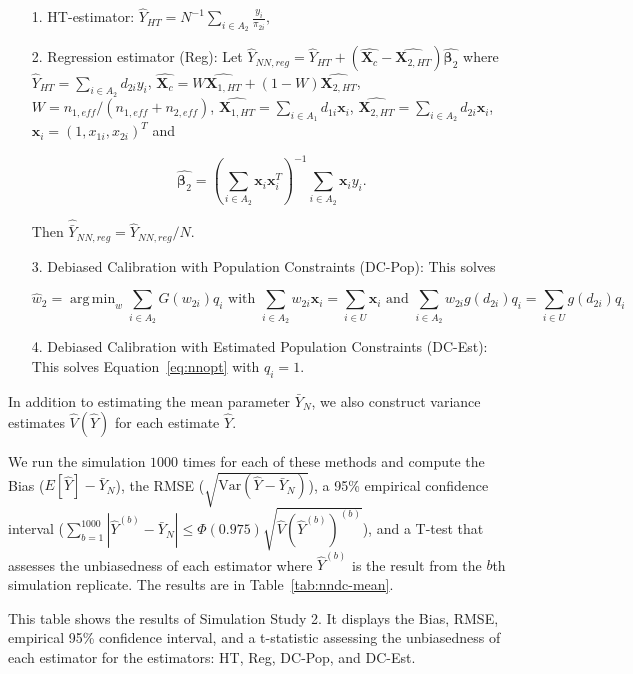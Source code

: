 \documentclass[12pt]{article}
\DeclareMathOperator*{\argmin}{arg\,min}
\newcommand{\Var}{{\text{Var}}}
\renewcommand{\bf}[1]{\mathbf{#1}}
\begin{document}
\begin{itemize}
  \item[1.] HT-estimator: $\hat Y_{HT} = N^{-1} \sum_{i \in A_2}
    \frac{y_i}{\pi_{2i}},$
  \item[2.] Regression estimator (Reg): Let $\hat Y_{NN, reg} = \hat Y_{HT} + (
    \hat{\bf X_c} - \hat{\bf X_{2, HT}}) \hat{\bm \beta_2}$ where $\hat Y_{HT} =
    \sum_{i \in A_2} d_{2i} y_i$, $\hat{\bf X_c} = W \hat{\bf X_{1, HT}} + (1 -
    W)\hat{\bf X_{2, HT}}$, $W = n_{1,eff} / (n_{1,eff} + n_{2, eff})$,
    $\hat{\bf X_{1, HT}} = \sum_{i \in A_1} d_{1i} \bf x_{i}$, $\hat{\bf X_{2,
    HT}} = \sum_{i \in A_2} d_{2i} \bf x_{i}$, $\bf x_i = (1, x_{1i}, x_{2i})^T$
    and 

    $$ \hat{\bm \beta_2} = \left(\sum_{i \in A_2} \bf x_i \bf x_i^T\right)^{-1}
    \sum_{i \in A_2} \bf x_i y_i.$$

    Then $\hat{\bar Y}_{NN, reg} = \hat Y_{NN, reg} / N$.
  \item[3.] Debiased Calibration with Population Constraints (DC-Pop): This 
    solves 

  \begin{equation*}
  \hat w_2 = \argmin_w \sum_{i \in A_2} G(w_{2i}) q_i \text{ with } 
  \sum_{i \in A_2} w_{2i} \bf x_i = \sum_{i \in U} \bf x_i \text{ and } 
  \sum_{i \in A_2} w_{2i} g(d_{2i}) q_i = \sum_{i \in U} g(d_{2i}) q_i
  \end{equation*}

  \item[4.] Debiased Calibration with Estimated Population Constraints (DC-Est):
    This solves Equation~\eqref{eq:nnopt} with $q_i = 1$.
\end{itemize}

In addition to estimating the mean parameter $\bar Y_N$, we also construct
variance estimates $\hat V(\hat Y)$ for each estimate $\hat Y$.

We run the simulation $1000$ times for each of these methods and compute the
Bias ($E[\hat Y] - \bar Y_N$), the RMSE ($\sqrt{\Var(\hat Y - \bar Y_N)}$), a 95\%
empirical confidence interval ($\sum_{b = 1}^{1000} |\hat Y^{(b)} - \bar Y_N| \leq 
\Phi(0.975)\sqrt{\hat V(\hat Y^{(b)})^{(b)}}$), and a T-test that assesses the
unbiasedness of each estimator where $\hat Y^{(b)}$ is the result from the $b$th
simulation replicate. The results are in Table~\ref{tab:nndc-mean}.

\begin{table}[ht!]
  \centering

\caption{This table shows the results of Simulation Study 2. It displays the
Bias, RMSE, empirical 95\% confidence interval, and a t-statistic assessing the
unbiasedness of each estimator for the estimators: HT, Reg, DC-Pop, and
DC-Est.}
\label{tab:nndc-mean}
\end{table}
\end{document}
